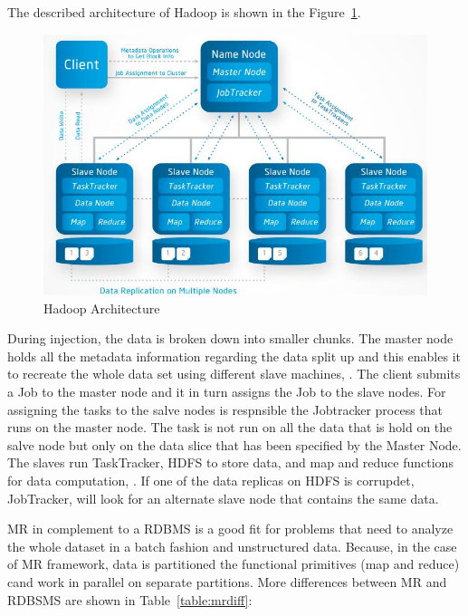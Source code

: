 The described architecture of Hadoop is shown in the \mbox{Figure \ref{hdfs_arch}}.

\begin{figure}[!ht]
\centering
\includegraphics[width=15cm]{hdfs_architecture}
\caption{Hadoop Architecture\cite{hdfsFigure}}\label{hdfs_arch}
\end{figure}

During injection, the data is broken down into smaller chunks. The master node holds all the metadata information regarding the data split up and this enables it to recreate the whole data set using different slave machines, \cite{blog}. The client submits a Job to the master node and it in turn assigns the Job to the slave nodes. For assigning the tasks to the salve nodes is respnsible the Jobtracker process that runs on the master node. The task is not run on all the data that is hold on the salve node but only on the data slice that has been specified by the Master Node. The slaves run TaskTracker, HDFS to store data, and map and reduce functions for data computation, \cite{rosebt}. If one of the data replicas on HDFS is corrupdet, JobTracker, will look for an alternate slave node that contains the same data. 

MR in complement to a RDBMS is a good fit for problems that need to analyze the whole dataset in a batch fashion and unstructured data. Because, in the case of MR framework, data is partitioned the functional primitives (map and reduce) cand work in parallel on separate partitions. More differences between MR and RDBSMS are shown in \mbox {Table \ref{table:mrdiff}}:

